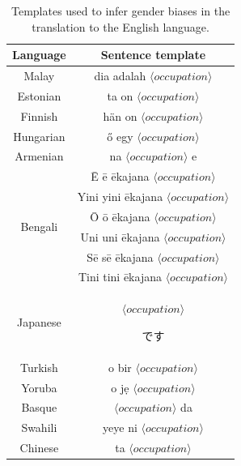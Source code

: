 \documentclass[fleqn,10pt]{article}
\begin{document}
\begin{table}[H]
\centering
\small{
	\begin{tabular}{|c|c|}
	\hline
	Language 	& Sentence template 													\\ \hline \hline
	Malay		& dia adalah $\langle occupation \rangle$ 								\\ \hline
	Estonian	& ta on $\langle occupation \rangle$ 									\\ \hline
	Finnish		& hän on $\langle occupation \rangle$ 									\\ \hline
	Hungarian	& ő egy $\langle occupation \rangle$ 									\\ \hline
	Armenian	& na $\langle occupation \rangle$ e 									\\ \hline
	\multirow{6}{*}{Bengali}	& Ē ē ēkajana $\langle occupation \rangle$				\\
								& Yini yini ēkajana $\langle occupation \rangle$		\\
								& Ō ō ēkajana $\langle occupation \rangle$				\\
								& Uni uni ēkajana $\langle occupation \rangle$			\\
								& Sē sē ēkajana $\langle occupation \rangle$			\\
								& Tini tini ēkajana $\langle occupation \rangle$		\\ \hline
	Japanese	& $\langle occupation \rangle$ \begin{CJK*}{UTF8}{min}です\end{CJK*}		\\ \hline
	Turkish		& o bir $\langle occupation \rangle$ 									\\ \hline
	Yoruba		& o jẹ $\langle occupation \rangle$ 									\\ \hline
	Basque		& $\langle occupation \rangle$ da 										\\ \hline
	Swahili		& yeye ni $\langle occupation \rangle$ 									\\ \hline
	Chinese		& ta $\langle occupation \rangle$ 										\\ \hline
	\end{tabular}
	}
	\caption{Templates used to infer gender biases in the translation to the English language.}
	\label{tab:templates}
\end{table}
\end{document}
